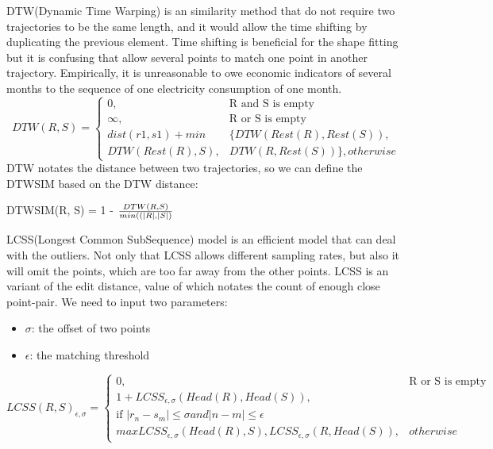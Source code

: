 DTW(Dynamic Time Warping) is an similarity method that do not require two trajectories to be the same length, and it would allow the time shifting by duplicating the previous element.  Time shifting is beneficial for the shape fitting but it is confusing that allow several points to match one point in another trajectory. Empirically, it is unreasonable to owe economic indicators of several months to the sequence of one electricity consumption of one month.
\begin{equation}
	DTW(R, S) = \left\{
	\begin{array}{ll}
		0,  & \text{R and S is empty}  \\
		\infty,  & \text{R or S is empty}  \\
		dist(r1, s1) + min & \{DTW(Rest(R), Rest(S)),  \\
		 DTW(Rest(R), S), & DTW(R, Rest(S))\}, otherwise
	\end{array}
	\right.
\end{equation} 
DTW notates the distance between two trajectories, so we can define the DTWSIM based on the DTW distance:
\begin{definition}
	DTWSIM(R, S) = 1 - $\frac{DTW(R, S)}{min(\text(|R|, |S|)}$
\end{definition}

LCSS(Longest Common SubSequence) model is an efficient model that can deal with the outliers. Not only that LCSS allows different sampling rates, but also it will omit the points, which are too far away from the other points. LCSS is an variant of the edit distance, value of which notates the count of enough close point-pair. We need to input two parameters:
\begin{itemize}
	\item $\sigma$: the offset of two points
	\item $\epsilon$: the matching threshold 
\end{itemize} 
\begin{equation}
	LCSS(R, S)_{\epsilon, \sigma} = \left\{
	\begin{array}{ll}
		0, & \text{R or S is empty} \\
		1 + LCSS_{\epsilon, \sigma}(Head(R), Head(S)), \\
		\text{if $|r_n - s_m| \leq \sigma and |n - m| \leq \epsilon$} \\
		max{LCSS_{\epsilon, \sigma}(Head(R), S), LCSS_{\epsilon, \sigma}(R, Head(S))}, & otherwise
	\end{array}
	\right.
\end{equation}

